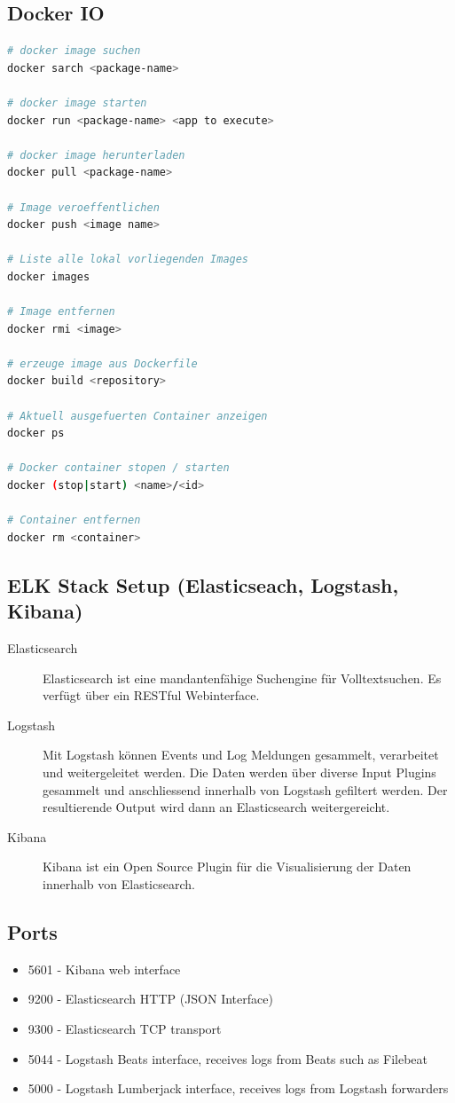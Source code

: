 \subsection{Docker IO}
\begin{lstlisting}[language=bash]
# docker image suchen
docker sarch <package-name>

# docker image starten
docker run <package-name> <app to execute>

# docker image herunterladen
docker pull <package-name>

# Image veroeffentlichen
docker push <image name>

# Liste alle lokal vorliegenden Images
docker images

# Image entfernen
docker rmi <image>

# erzeuge image aus Dockerfile
docker build <repository>

# Aktuell ausgefuerten Container anzeigen
docker ps

# Docker container stopen / starten
docker (stop|start) <name>/<id>

# Container entfernen
docker rm <container>
\end{lstlisting}


\subsection{ELK Stack Setup (Elasticseach, Logstash, Kibana)}
\begin{description}
	\item[Elasticsearch] Elasticsearch ist eine mandantenfähige Suchengine für Volltextsuchen. Es verfügt über ein RESTful Webinterface.
	\item[Logstash] Mit Logstash können Events und Log Meldungen gesammelt, verarbeitet und weitergeleitet werden. Die Daten werden über diverse Input Plugins gesammelt und anschliessend innerhalb von Logstash gefiltert werden. Der resultierende Output wird dann an Elasticsearch weitergereicht.
	\item[Kibana] Kibana ist ein Open Source Plugin für die Visualisierung der Daten innerhalb von Elasticsearch. 
\end{description}


\subsection{Ports}
\begin{itemize}
	\item 5601 - Kibana web interface
	\item 9200 - Elasticsearch HTTP (JSON Interface)
	\item 9300 - Elasticsearch TCP transport
	\item 5044 - Logstash Beats interface, receives logs from Beats such as Filebeat
	\item 5000 - Logstash Lumberjack interface, receives logs from Logstash forwarders
\end{itemize}


